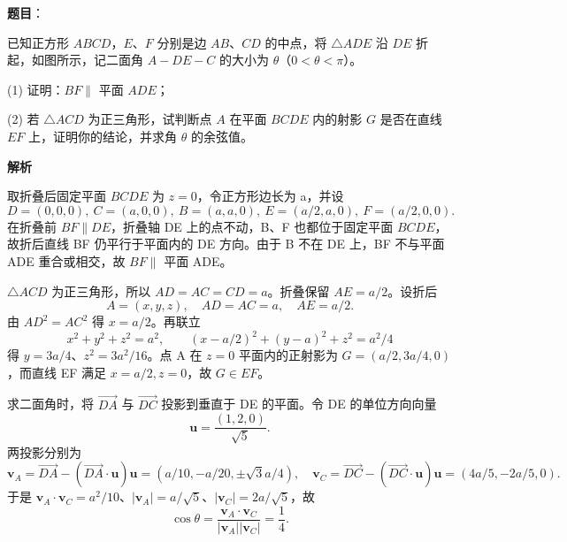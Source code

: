 \begin{answer}

\textbf{题目}：

已知正方形 \(ABCD\)，\(E\)、\(F\) 分别是边 \(AB\)、\(CD\) 的中点，将 \(\triangle ADE\) 沿 \(DE\) 折起，如图所示，记二面角 \(A-DE-C\) 的大小为 \(\theta\)（\(0<\theta<\pi\)）。

(1) 证明：\(BF\parallel\) 平面 \(ADE\)；

(2) 若 \(\triangle ACD\) 为正三角形，试判断点 \(A\) 在平面 \(BCDE\) 内的射影 \(G\) 是否在直线 \(EF\) 上，证明你的结论，并求角 \(\theta\) 的余弦值。
\nopagebreak[4]
\begin{center}\end{center}
\nopagebreak[4]
\textbf{解析}


取折叠后固定平面 $BCDE$ 为 $z=0$，令正方形边长为 a，并设
\nopagebreak[4]
\[
D=(0,0,0),\ C=(a,0,0),\ B=(a,a,0),\ E=(a/2,a,0),\ F=(a/2,0,0).
\]
在折叠前 $BF\parallel DE$，折叠轴 DE 上的点不动，B、F 也都位于固定平面 $BCDE$，故折后直线 BF 仍平行于平面内的 DE 方向。由于 B 不在 DE 上，BF 不与平面 ADE 重合或相交，故 $BF\parallel$ 平面 ADE。


$\triangle ACD$ 为正三角形，所以 $AD=AC=CD=a$。折叠保留 $AE=a/2$。设折后
\nopagebreak[4]
\[
A=(x,y,z),\quad AD=AC=a,\quad AE=a/2.
\]
由 $AD^2=AC^2$ 得 $x=a/2$。再联立
\nopagebreak[4]
\[
x^2+y^2+z^2=a^2,\qquad
(x-a/2)^2+(y-a)^2+z^2=a^2/4
\]
得 $y=3a/4$、$z^2=3a^2/16$。点 A 在 $z=0$ 平面内的正射影为 $G=(a/2,3a/4,0)$，而直线 EF 满足 $x=a/2,z=0$，故 $G\in EF$。

求二面角时，将 $\overrightarrow{DA}$ 与 $\overrightarrow{DC}$ 投影到垂直于 DE 的平面。令 DE 的单位方向向量
\nopagebreak[4]
\[
\mathbf u=\frac{(1,2,0)}{\sqrt5}.
\]
两投影分别为
\nopagebreak[4]
\[
\mathbf v_A=\overrightarrow{DA}-(\overrightarrow{DA}\cdot\mathbf u)\mathbf u
=(a/10,-a/20,\pm\sqrt3a/4),\quad
\mathbf v_C=\overrightarrow{DC}-(\overrightarrow{DC}\cdot\mathbf u)\mathbf u
=(4a/5,-2a/5,0).
\]
于是 $\mathbf v_A\cdot\mathbf v_C=a^2/10$、$|\mathbf v_A|=a/\sqrt5$、$|\mathbf v_C|=2a/\sqrt5$，故
\nopagebreak[4]
\[
\cos\theta=\frac{\mathbf v_A\cdot\mathbf v_C}{|\mathbf v_A||\mathbf v_C|}=\frac14.
\]
\nopagebreak[4]
\begin{center}\end{center}
\nopagebreak[4]


\end{answer}
